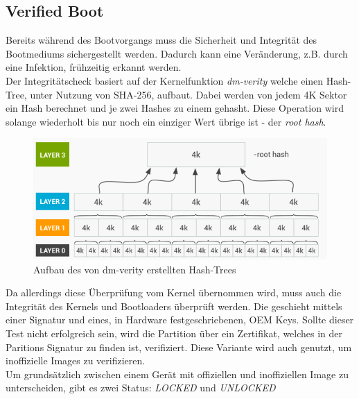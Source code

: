 	\subsection{Verified Boot}
	Bereits während des Bootvorgangs muss die Sicherheit und Integrität des Bootmediums sichergestellt werden. Dadurch kann eine Veränderung, z.B. durch eine Infektion, frühzeitig erkannt werden.\\
	Der Integritätscheck basiert auf der Kernelfunktion \textit{dm-verity} welche einen Hash-Tree, unter Nutzung von SHA-256, aufbaut. Dabei werden von jedem 4K Sektor ein Hash berechnet und je zwei Hashes zu einem gehasht. Diese Operation wird solange wiederholt bis nur noch ein einziger Wert übrige ist - der \textit{root hash}.
	\begin{figure}[h]
	\centering
	\includegraphics[width=0.7\linewidth]{android_pages/graphics/dm-verity-table}
	\caption[Aufbau des Hash-Trees]{Aufbau des von dm-verity erstellten Hash-Trees\protect\cite{VerifiedBoot}}
	\label{fig:dm-verity-table}
	\end{figure}
	Da allerdings diese Überprüfung vom Kernel übernommen wird, muss auch die Integrität des Kernels und Bootloaders überprüft werden. Die geschieht mittels einer Signatur und eines, in Hardware festgeschriebenen, OEM Keys. Sollte dieser Test nicht erfolgreich sein, wird die Partition über ein Zertifikat, welches in der Paritions Signatur zu finden ist, verifiziert. Diese Variante wird auch genutzt, um inoffizielle Images zu verifizieren. \\
	Um grundsätzlich zwischen einem Gerät mit offiziellen und inoffiziellen Image zu unterscheiden, gibt es zwei Status: \textit{LOCKED} und \textit{UNLOCKED}
